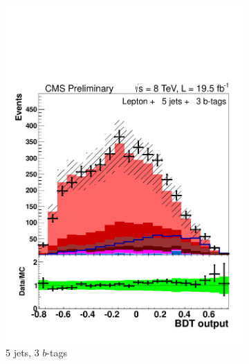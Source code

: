 \begin{figure}[hbtp]
\begin{subfigure}[hbtp]{0.31\textwidth}
     \includegraphics[width=\textwidth]{Figures/Analysis_2_Diagrams/LJ_plots_lep/5j3t/lep_disc_final10v16_8TeV_CFMlpANN_BDT_5j3t_cumulative_wRatio_noLegend_lin.pdf}
     \caption{5 jets, 3 $b$-tags}\label{lj_BDToutput_8TeV_3}
   \end{subfigure}
   ~ %
   \begin{subfigure}[hbtp]{0.31\textwidth}

\end{subfigure}
\end{figure}
